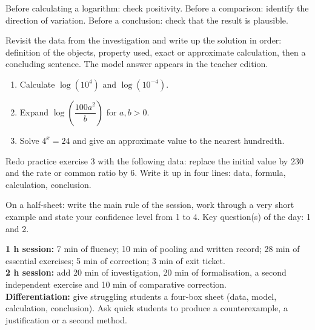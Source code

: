 \begin{traceecrite}Before calculating a logarithm: check positivity. Before a comparison: identify the direction of variation. Before a conclusion: check that the result is plausible.\end{traceecrite}

\begin{exemple}
Revisit the data from the investigation and write up the solution in order: definition of the objects, property used, exact or approximate calculation, then a concluding sentence. The model answer appears in the teacher edition.
\end{exemple}

\begin{exercice}[-- essentiel]
\begin{enumerate}\item Calculate $\log(10^4)$ and $\log(10^{-4})$.\item Expand $\log\!\left(\dfrac{100a^2}{b}\right)$ for $a,b>0$.\item Solve $4^x=24$ and give an approximate value to the nearest hundredth.\end{enumerate}
\end{exercice}


\begin{dm}Redo practice exercise 3 with the following data: replace the initial value by $230$ and the rate or common ratio by $6$. Write it up in four lines: data, formula, calculation, conclusion.\end{dm}

\begin{sortie}On a half-sheet: write the main rule of the session, work through a very short example and state your confidence level from 1 to 4. Key question(s) of the day: 1 and 2.\end{sortie}

\ifprof
\begin{methode}
\textbf{1 h session:} 7 min of fluency; 10 min of pooling and written record; 28 min of essential exercises; 5 min of correction; 3 min of exit ticket.\\
\textbf{2 h session:} add 20 min of investigation, 20 min of formalisation, a second independent exercise and 10 min of comparative correction.\\
\textbf{Differentiation:} give struggling students a four-box sheet (data, model, calculation, conclusion). Ask quick students to produce a counterexample, a justification or a second method.
\end{methode}
\fi
